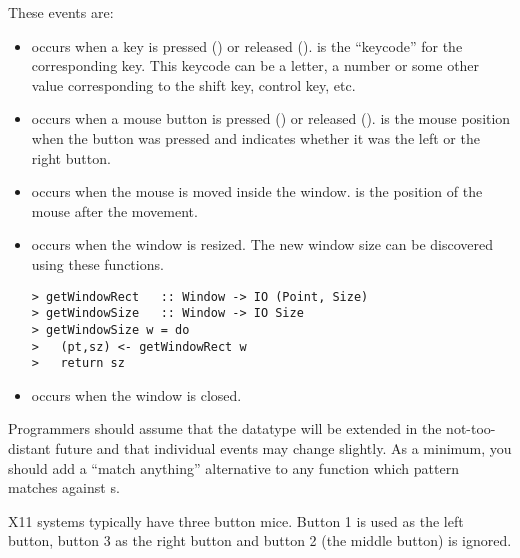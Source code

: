 These events are:

\begin{itemize}
\item
   occurs when a key is pressed 
  ()
  or released ().   is the ``keycode'' for the
  corresponding key.  This keycode can be a letter, a number or some other 
  value corresponding to the shift key, control key, etc.  


\item
   occurs when a mouse button is
  pressed () or released ().
   is the mouse position when the button was pressed and
   indicates whether it was the left or the right button.

\item
   occurs when the mouse is moved inside the window.
   is the position of the mouse after the movement.

\item
   occurs when the window is resized.
  The new window size can be discovered using these functions.

\begin{verbatim}
> getWindowRect   :: Window -> IO (Point, Size)
> getWindowSize   :: Window -> IO Size
> getWindowSize w = do
>   (pt,sz) <- getWindowRect w
>   return sz
\end{verbatim}

\item
   occurs when the window is closed.

\end{itemize}

\begin{portability}
\item
  Programmers should assume that the  datatype will be extended in the
  not-too-distant future and that individual events may change slightly.
  As a minimum, you should add a ``match anything'' alternative to
  any function which pattern matches against s.

\item
X11 systems typically have three button mice.  Button 1 is used as the
left button, button 3 as the right button and button 2 (the middle
button) is ignored.

\end{portability}

